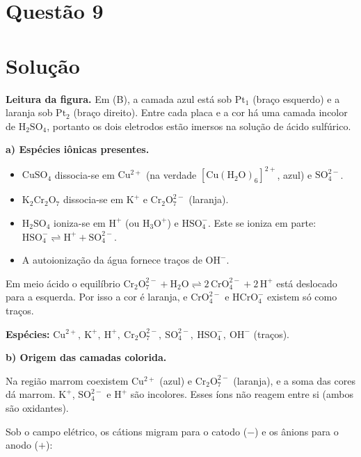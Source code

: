 \documentclass{article}%
\begin{document}
\section*{Questão 9}

\section*{Solução}

\textbf{Leitura da figura.} Em (B), a camada azul está sob $\mathrm{Pt_1}$ (braço esquerdo) e a laranja sob $\mathrm{Pt_2}$ (braço direito). Entre cada placa e a cor há uma camada incolor de $\mathrm{H_2SO_4}$, portanto os dois eletrodos estão imersos na solução de ácido sulfúrico.

\medskip
\textbf{a) Espécies iônicas presentes.}

\begin{itemize}
\item $\mathrm{CuSO_4}$ dissocia-se em $\mathrm{Cu^{2+}}$ (na verdade $[\mathrm{Cu(H_2O)_6}]^{2+}$, azul) e $\mathrm{SO_4^{2-}}$.
\item $\mathrm{K_2Cr_2O_7}$ dissocia-se em $\mathrm{K^+}$ e $\mathrm{Cr_2O_7^{2-}}$ (laranja).
\item $\mathrm{H_2SO_4}$ ioniza-se em $\mathrm{H^+}$ (ou $\mathrm{H_3O^+}$) e $\mathrm{HSO_4^-}$. Este se ioniza em parte: $\mathrm{HSO_4^-} \rightleftharpoons \mathrm{H^+}+\mathrm{SO_4^{2-}}$.
\item A autoionização da água fornece traços de $\mathrm{OH^-}$.
\end{itemize}

Em meio ácido o equilíbrio $\mathrm{Cr_2O_7^{2-}+H_2O\rightleftharpoons 2\,CrO_4^{2-}+2\,H^+}$ está deslocado para a esquerda. Por isso a cor é laranja, e $\mathrm{CrO_4^{2-}}$ e $\mathrm{HCrO_4^-}$ existem só como traços.

\textbf{Espécies:} $\mathrm{Cu^{2+}},\ \mathrm{K^+},\ \mathrm{H^+},\ \mathrm{Cr_2O_7^{2-}},\ \mathrm{SO_4^{2-}},\ \mathrm{HSO_4^-},\ \mathrm{OH^-}$ (traços).

\medskip
\textbf{b) Origem das camadas colorida.}

Na região marrom coexistem $\mathrm{Cu^{2+}}$ (azul) e $\mathrm{Cr_2O_7^{2-}}$ (laranja), e a soma das cores dá marrom. $\mathrm{K^+}$, $\mathrm{SO_4^{2-}}$ e $\mathrm{H^+}$ são incolores. Esses íons não reagem entre si (ambos são oxidantes).

Sob o campo elétrico, os cátions migram para o catodo ($-$) e os ânions para o anodo ($+$):
\end{document}
